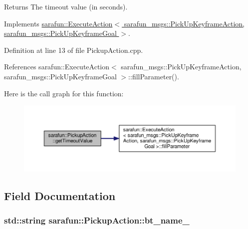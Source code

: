 \begin{DoxyReturn}{Returns}
The timeout value (in seconds). 
\end{DoxyReturn}


Implements \hyperlink{classsarafun_1_1ExecuteAction_aba6cfa8a8ce19e735eb6394424df6d17_aba6cfa8a8ce19e735eb6394424df6d17}{sarafun\-::\-Execute\-Action$<$ sarafun\-\_\-msgs\-::\-Pick\-Up\-Keyframe\-Action, sarafun\-\_\-msgs\-::\-Pick\-Up\-Keyframe\-Goal $>$}.



Definition at line 13 of file Pickup\-Action.\-cpp.



References sarafun\-::\-Execute\-Action$<$ sarafun\-\_\-msgs\-::\-Pick\-Up\-Keyframe\-Action, sarafun\-\_\-msgs\-::\-Pick\-Up\-Keyframe\-Goal $>$\-::fill\-Parameter().



Here is the call graph for this function\-:\nopagebreak
\begin{figure}[H]
\begin{center}
\leavevmode
\includegraphics[width=350pt]{d8/dba/classsarafun_1_1PickupAction_a02643cdc836095102e5622b660233f26_a02643cdc836095102e5622b660233f26_cgraph}
\end{center}
\end{figure}




\subsection{Field Documentation}
\hypertarget{classsarafun_1_1PickupAction_a67b2fdfacb038bcd76dca5a3c2c2077c_a67b2fdfacb038bcd76dca5a3c2c2077c}{
\subsubsection[{bt\-\_\-name\-\_\-}]{\setlength{\rightskip}{0pt plus 5cm}std\-::string sarafun\-::\-Pickup\-Action\-::bt\-\_\-name\-\_\-\hspace{0.3cm}{\ttfamily [private]}}}\label{classsarafun_1_1PickupAction_a67b2fdfacb038bcd76dca5a3c2c2077c_a67b2fdfacb038bcd76dca5a3c2c2077c}


